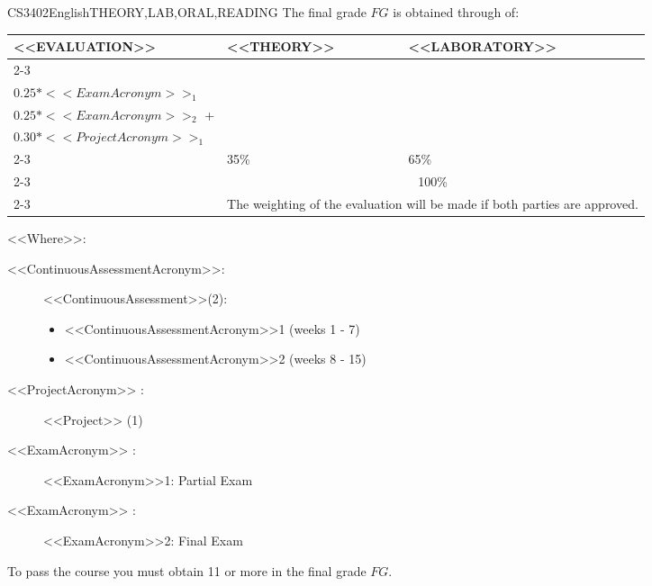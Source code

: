   \begin{evaluation}{CS3402}{English}{THEORY,LAB,ORAL,READING}
  The final grade $FG$ is obtained through of:
 
  \begin{tabularx}{0.9\textwidth}{|X|p{}|p{}|} \hline
  \multirow{4}{*}{\uppercase{<<Evaluation>>}} & \uppercase{<<Theory>>} & \uppercase{<<Laboratory>>} \\ \cline{2-3}
  & %
      \begin{minipage}{0.95\textwidth}
      \begin{tabular}{l}
        $0.10*<<ContinuousAssessmentAcronym>>_{1}$  + \\
        $0.25*<<ExamAcronym>>_{1}$ 
      \end{tabular} 
      \end{minipage} 
  & %
      \begin{minipage}{0.95\textwidth}
      \begin{tabular}{l}
        $0.10*<<ContinuousAssessmentAcronym>>_{2}$  + \\
        $0.25*<<ExamAcronym>>_{2}$  +  \\
        $0.30*<<ProjectAcronym>>_{1}$
      \end{tabular} 
      \end{minipage}                 \\ \cline{2-3}
  
  & %
  35\% 
  & %
  65\% \\ \cline{2-3}
  & \multicolumn{2}{|c|}{100\%}  \\ \cline{2-3}
  & \multicolumn{2}{|c|}{The weighting of the evaluation will be made if both parties are approved.}  \\ \hline
  \end{tabularx}
    
  \vspace{2mm}
  \noindent <<Where>>:
  \begin{description}
      \item[<<ContinuousAssessmentAcronym>>:]<<ContinuousAssessment>>(2):
      \begin{itemize}
              \item <<ContinuousAssessmentAcronym>>1 (weeks 1 - 7) 
              \item <<ContinuousAssessmentAcronym>>2 (weeks 8 - 15)
      \end{itemize}
      \item[<<ProjectAcronym>> :] <<Project>> (1)
      \item[<<ExamAcronym>> :] <<ExamAcronym>>1: Partial Exam
      \item[<<ExamAcronym>> :] <<ExamAcronym>>2: Final Exam
  \end{description}

  \noindent To pass the course you must obtain 11 or more in the final grade $FG$.
  \end{evaluation}


